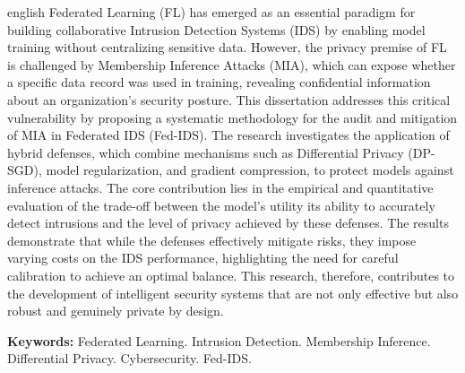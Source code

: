\documentclass[
	12pt,				%
	openright,			%
	oneside,			%
	a4paper,			%
	english,			%
	french,				%
	spanish,			%
	brazil,				%
	]{abntex2}
\begin{document}
\begin{resumo}[Abstract]
 \begin{otherlanguage*}{english}
Federated Learning (FL) has emerged as an essential paradigm for building collaborative Intrusion Detection Systems (IDS) by enabling model training without centralizing sensitive data. However, the privacy premise of FL is challenged by Membership Inference Attacks (MIA), which can expose whether a specific data record was used in training, revealing confidential information about an organization's security posture. This dissertation addresses this critical vulnerability by proposing a systematic methodology for the audit and mitigation of MIA in Federated IDS (Fed-IDS). The research investigates the application of hybrid defenses, which combine mechanisms such as Differential Privacy (DP-SGD), model regularization, and gradient compression, to protect models against inference attacks. The core contribution lies in the empirical and quantitative evaluation of the trade-off between the model's utility its ability to accurately detect intrusions and the level of privacy achieved by these defenses. The results demonstrate that while the defenses effectively mitigate risks, they impose varying costs on the IDS performance, highlighting the need for careful calibration to achieve an optimal balance. This research, therefore, contributes to the development of intelligent security systems that are not only effective but also robust and genuinely private by design.

\textbf{Keywords:} Federated Learning. Intrusion Detection. Membership Inference. Differential Privacy. Cybersecurity. Fed-IDS.
 \end{otherlanguage*}
\end{resumo}



\listoffigures*
\cleardoublepage



\listoftables*
\cleardoublepage


\end{document}
